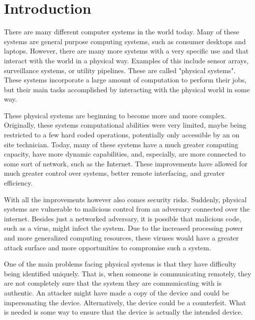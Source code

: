 %
%
%

\chapter{Introduction}
\label{chapter:intro}

There are many different computer systems in the world today. Many of these systems are general purpose computing
systems, such as consumer desktops and laptops. However, there are many more systems with a very specific use
and that interact with the world in a physical way. Examples of this include sensor arrays, surveillance systems,
or utility pipelines. These are called "physical systems".
These systems incorporate a large amount of computation to perform their jobs, but their main tasks accomplished
by interacting with the physical world in some way. 

These physical systems are beginning to become more and more complex. Originally, these systems computational
abilities were very limited, maybe being restricted to a few hard coded operations, potentially only accessible by
an on site technician. Today, many of these systems have a much greater computing capacity, have more
dynamic capabilities, and, especially, are more connected to some sort of network, such as the Internet.
These improvements have allowed for much greater control over systems, better remote interfacing, and greater
efficiency.

With all the improvements however also comes security risks. Suddenly, physical systems are vulnerable to malicious
control from an adversary connected over the internet. Besides just a networked adversary, it is possible that
malicious code, such as a virus, might infect the system. Due to the increased processing power and more 
generalized computing resources, these viruses would have a greater attack surface and more opportunities to
compromise such a system.

One of the main problems facing physical systems is that they have difficulty being identified uniquely. That is,
when someone is communicating remotely, they  are not completely sure that the system they are communicating
with is authentic. An attacker might have made a copy of the device and could be impersonating the device. 
Alternatively, the device could be a counterfeit. 
What is needed is some way to ensure that the device is actually the intended device.

